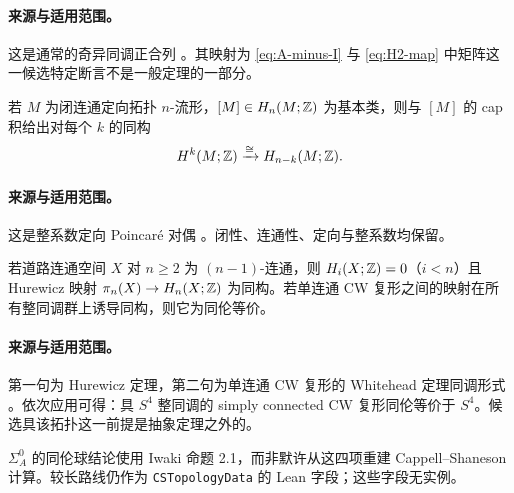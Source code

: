 \paragraph{来源与适用范围。}
这是通常的奇异同调正合列 \cite[Sections~2.2 and 4.2]{Hatcher2002}。其映射为 \eqref{eq:A-minus-I} 与 \eqref{eq:H2-map} 中矩阵这一候选特定断言不是一般定理的一部分。

\begin{externalresult}\label{prop:PD}
若 $M$ 为闭连通定向拓扑 $n$-流形，$[M]\in H_n(M;\mathbb{Z})$ 为基本类，则与 $[M]$ 的 cap 积给出对每个 $k$ 的同构
\[
H^k(M;\mathbb{Z})\xrightarrow{\cong}H_{n-k}(M;\mathbb{Z}).
\]
\end{externalresult}

\paragraph{来源与适用范围。}
这是整系数定向 Poincar\'e 对偶 \cite[Section~3.3]{Hatcher2002}。闭性、连通性、定向与整系数均保留。

\begin{externalresult}\label{prop:hurewicz-whitehead}
若道路连通空间 $X$ 对 $n\ge2$ 为 $(n-1)$-连通，则 $H_i(X;\mathbb{Z})=0$（$i<n$）且 Hurewicz 映射 $\pi_n(X)\to H_n(X;\mathbb{Z})$ 为同构。若单连通 CW 复形之间的映射在所有整同调群上诱导同构，则它为同伦等价。
\end{externalresult}

\paragraph{来源与适用范围。}
第一句为 Hurewicz 定理，第二句为单连通 CW 复形的 Whitehead 定理同调形式 \cite[Sections~4.1--4.2]{Hatcher2002}。依次应用可得：具 $S^4$ 整同调的 simply connected CW 复形同伦等价于 $S^4$。候选具该拓扑这一前提是抽象定理之外的。

\begin{remark}[为何采用短路线]\label{rem:topology-tools}
$\Sigma_A^0$ 的同伦球结论使用 Iwaki 命题 2.1，而非默许从这四项重建 Cappell--Shaneson 计算。较长路线仍作为 \texttt{CSTopologyData} 的 Lean 字段；这些字段无实例。
\end{remark}
